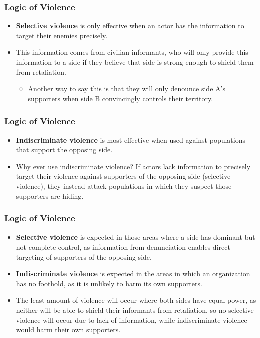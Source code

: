\documentclass{beamer}
\begin{document}
\begin{frame} 
	\frametitle{\LARGE{Logic of Violence}}
	\begin{itemize}
		\item \textbf{Selective violence} is only effective when an actor has the information to target their enemies precisely. \pause
		\item This information comes from civilian informants, who will only provide this information to a side if they believe that side is strong enough to shield them from retaliation. 
		\begin{itemize}
			\item Another way to say this is that they will only denounce side A's supporters when side B convincingly controls their territory. \pause
		\end{itemize}
	\end{itemize}
\end{frame}

\begin{frame} 
	\frametitle{\LARGE{Logic of Violence}}
	\begin{itemize}
		\item \textbf{Indiscriminate violence} is most effective when used against populations that support the opposing side. \pause
		\item Why ever use indiscriminate violence? If actors lack information to precisely target their violence against supporters of the opposing side (selective violence), they instead attack populations in which they suspect those supporters are hiding. 
	\end{itemize}
\end{frame}


\begin{frame} 
	\frametitle{\LARGE{Logic of Violence}}
	\begin{itemize}
		\item \textbf{Selective violence} is expected in those areas where a side has dominant but not complete control, as information from denunciation enables direct targeting of supporters of the opposing side. \pause
		\item \textbf{Indiscriminate violence} is expected in the areas in which an organization has no foothold, as it is unlikely to harm its own supporters.
		\item The least amount of violence will occur where both sides have equal power, as neither will be able to shield their informants from retaliation, so no selective violence will occur due to lack of information, while indiscriminate violence would harm their own supporters.
	\end{itemize}
\end{frame}
\end{document}
